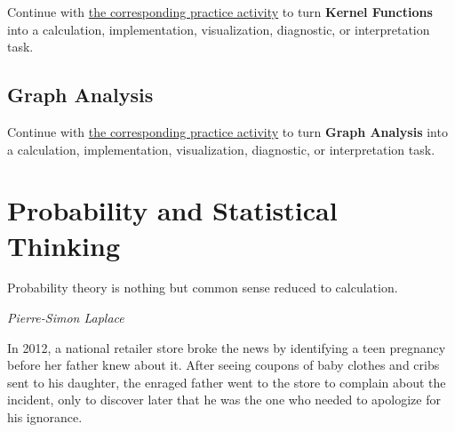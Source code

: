 \documentclass[
  letterpaper,
]{scrbook}
\begin{document}
\begin{tcolorbox}[enhanced jigsaw, arc=.35mm, bottomrule=.15mm, bottomtitle=1mm, breakable, colback=white, colbacktitle=quarto-callout-tip-color!10!white, colframe=quarto-callout-tip-color-frame, coltitle=black, left=2mm, leftrule=.75mm, opacityback=0, opacitybacktitle=0.6, rightrule=.15mm, title=\textcolor{quarto-callout-tip-color}{\faLightbulb}\hspace{0.5em}{Put it into practice}, titlerule=0mm, toprule=.15mm, toptitle=1mm]

Continue with \hyperref[sec-pr-03-kernel-functions]{the corresponding
practice activity} to turn \textbf{Kernel Functions} into a calculation,
implementation, visualization, diagnostic, or interpretation task.

\end{tcolorbox}

\section{Graph Analysis}\label{graph-analysis}

\begin{tcolorbox}[enhanced jigsaw, arc=.35mm, bottomrule=.15mm, bottomtitle=1mm, breakable, colback=white, colbacktitle=quarto-callout-tip-color!10!white, colframe=quarto-callout-tip-color-frame, coltitle=black, left=2mm, leftrule=.75mm, opacityback=0, opacitybacktitle=0.6, rightrule=.15mm, title=\textcolor{quarto-callout-tip-color}{\faLightbulb}\hspace{0.5em}{Put it into practice}, titlerule=0mm, toprule=.15mm, toptitle=1mm]

Continue with \hyperref[sec-pr-03-graph-analysis]{the corresponding
practice activity} to turn \textbf{Graph Analysis} into a calculation,
implementation, visualization, diagnostic, or interpretation task.

\end{tcolorbox}

\chapter{Probability and Statistical Thinking}\label{ch-probability}

Probability theory is nothing but common sense reduced to calculation.

\emph{Pierre-Simon Laplace}

In 2012, a national retailer store broke the news by identifying a teen
pregnancy before her father knew about it. After seeing coupons of baby
clothes and cribs sent to his daughter, the enraged father went to the
store to complain about the incident, only to discover later that he was
the one who needed to apologize for his ignorance.
\end{document}
